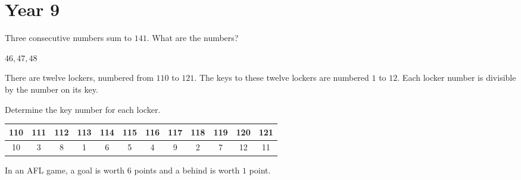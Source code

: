 \documentclass[a4paper,12pt,addpoints]{exam}
\begin{document}
\section*{Year 9}
\begin{questions}



\question[2] Three consecutive numbers sum to \(141\). What are the numbers?
\begin{solution}
 \(46,47,48\)
\end{solution}
\question[3]
There are twelve lockers, numbered from \(110\) to \(121\). The keys
to these twelve lockers are numbered \(1\) to \(12\). 
Each locker number is divisible by the number on its key.

Determine the key number for each locker.
\begin{solution}
\begin{center}
\begin{tabular}{ |c|c|c|c|c|c|c|c|c|c|c|c| }
\hline 110&111&112&113&114&115&116&117&118&119&120&121\\
\hline 10&3&8&1&6&5&4&9&2&7&12&11\\
\hline
\end{tabular}
\end{center}
\end{solution}
\question  In an AFL game, a goal is worth \(6\) points and a behind is worth \(1\) point.
\end{questions}
\end{document}
